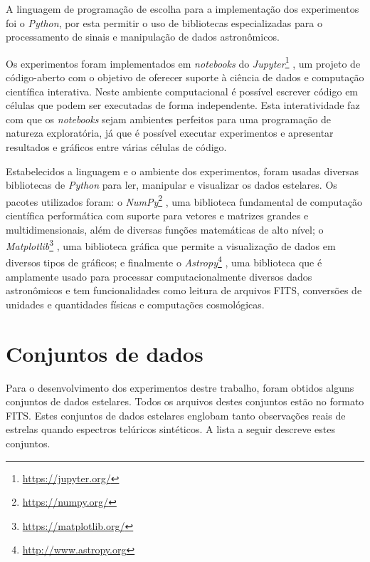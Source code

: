 A linguagem de programação de escolha para a implementação dos experimentos foi o \textit{Python}, por esta permitir o uso de bibliotecas especializadas para o processamento de sinais e manipulação de dados astronômicos.

Os experimentos foram implementados em \textit{notebooks} do \textit{Jupyter}\footnote{\url{https://jupyter.org/}} \citep{Kluyver:2016aa}, um projeto de código-aberto com o objetivo de oferecer suporte à ciência de dados e computação científica interativa. Neste ambiente computacional é possível escrever código em células que podem ser executadas de forma independente. Esta interatividade faz com que os \textit{notebooks} sejam ambientes perfeitos para uma programação de natureza exploratória, já que é possível executar experimentos e apresentar resultados e gráficos entre várias células de código.

Estabelecidos a linguagem e o ambiente dos experimentos, foram usadas diversas bibliotecas de \textit{Python} para ler, manipular e visualizar os dados estelares. Os pacotes utilizados foram: o \textit{NumPy}\footnote{\url{https://numpy.org/}} \citep{oliphant2006guide}, uma biblioteca fundamental de computação científica performática com suporte para vetores e matrizes grandes e multidimensionais, além de diversas funções matemáticas de alto nível; o \textit{Matplotlib}\footnote{\url{https://matplotlib.org/}} \citep{Hunter:2007}, uma biblioteca gráfica que permite a visualização de dados em diversos tipos de gráficos; e finalmente o \textit{Astropy}\footnote{\url{http://www.astropy.org}} \citep{astropy:2018}, uma biblioteca que é amplamente usado para processar computacionalmente diversos dados astronômicos e tem funcionalidades como leitura de arquivos FITS, conversões de unidades e quantidades físicas e computações cosmológicas.

\section{Conjuntos de dados}

Para o desenvolvimento dos experimentos destre trabalho, foram obtidos alguns conjuntos de dados estelares. Todos os arquivos destes conjuntos estão no formato FITS. Estes conjuntos de dados estelares englobam tanto observações reais de estrelas quando espectros telúricos sintéticos. A lista a seguir descreve estes conjuntos.

